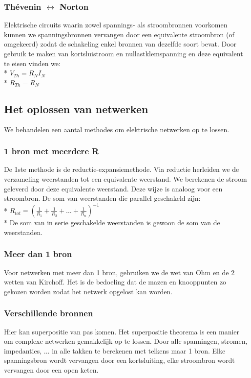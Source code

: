 \documentclass[10pt]{article}
\begin{document}
\subsubsection{Th\'evenin $\leftrightarrow$ Norton}
Elektrische circuits waarin zowel spannings- als stroombronnen voorkomen kunnen we spanningsbronnen vervangen door een equivalente stroombron (of omgekeerd) zodat de schakeling enkel bronnen van dezelfde soort bevat. Door gebruik te maken van kortsluistroom en nullastklemspanning en deze equivalent te eisen vinden we:\\*
$V_{Th} = R_NI_N$\\*
$R_{Th} = R_N$
\subsection{Het oplossen van netwerken}
We behandelen een aantal methodes om elektrische netwerken op te lossen.
\subsubsection{1 bron met meerdere R}
De 1ste methode is de reductie-expansiemethode. Via reductie herleiden we de verzameling weerstanden tot een equivalente weerstand. We berekenen de stroom geleverd door deze equivalente weerstand. Deze wijze is analoog voor een stroombron. De som van weerstanden die parallel geschakeld zijn:\\*
$R_{tot} = (\frac{1}{R_1} + \frac{1}{R_2} + \dots + \frac{1}{R_n})^{-1}$\\*
De som van in serie geschakelde weerstanden is gewoon de som van de weerstanden.
\subsubsection{Meer dan 1 bron}
Voor netwerken met meer dan 1 bron, gebruiken we de wet van Ohm en de 2 wetten van Kirchoff. Het is de bedoeling dat de mazen en knooppunten zo gekozen worden zodat het netwerk opgelost kan worden.
\subsubsection{Verschillende bronnen}
Hier kan superpositie van pas komen. Het superpositie theorema is een manier om complexe netwerken gemakkelijk op te lossen. Door alle spanningen, stromen, impedanties, $\dots$ in alle takken te berekenen met telkens maar 1 bron. Elke spanningsbron wordt vervangen door een kortsluiting, elke stroombron wordt vervangen door een open keten.
\end{document}
